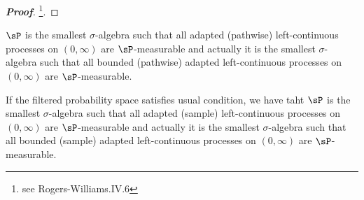 \begin{proof}[\bf Proof]
\footnote{see Rogers-Williams\cite{Rogers_1994}.IV.6}.
\end{proof}

\begin{theorem}\label{thm:previsible_sigma_algebra_contains_all_adapted_left_continuous_process}
$\sP$ is the smallest $\sigma$-algebra such that all adapted (pathwise) left-continuous processes on $(0,\infty)$ are $\sP$-measurable and actually it is the smallest $\sigma$-algebra such that all bounded (pathwise) adapted left-continuous processes on $(0,\infty)$ are $\sP$-measurable.%

If the filtered probability space satisfies usual condition, we have taht $\sP$ is the smallest $\sigma$-algebra such that all adapted (sample) left-continuous processes on $(0,\infty)$ are $\sP$-measurable and actually it is the smallest $\sigma$-algebra such that all bounded (sample) adapted left-continuous processes on $(0,\infty)$ are $\sP$-measurable.%
\end{theorem}


